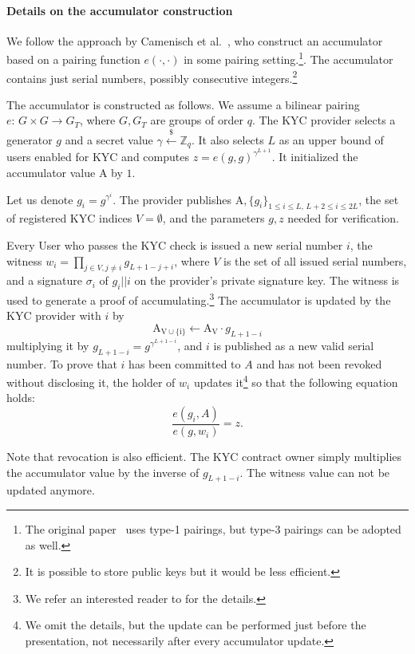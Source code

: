 \paragraph{Details on the accumulator construction}
We follow the approach by Camenisch et al.~\cite{Camenisch2009}, who construct an accumulator based on a pairing function $e(\cdot,\cdot)$ in some pairing setting.\footnote{The original paper~\cite{Camenisch2009} uses type-1 pairings, but type-3 pairings can be adopted as well.}.
The accumulator contains just serial numbers, possibly consecutive integers.\footnote{It is possible to store public keys but it would be less efficient.}

The accumulator is constructed as follows.
We assume a bilinear pairing $e:\,G\times G\rightarrow G_T$, where $G,G_T$ are groups of order $q$.
The KYC provider selects a generator $g$ and a secret value $\gamma\overset{\$}{\leftarrow} \mathbb{Z}_q$.
It also selects $L$ as an upper bound of users enabled for KYC and computes $z = e(g,g)^{\gamma^{L+1}}$.
It initialized the accumulator value $\mathrm{A}$ by $1$. 

Let us denote $g_i = g^{\gamma^i}$.
The provider publishes $\mathrm{A},\{g_i\}_{1\leq i\leq L, \,L+2\leq i \leq 2L}$, the set of registered KYC indices $V=\emptyset$, and the parameters $g,z$ needed for verification.

Every User who passes the KYC check is issued a new serial number $i$, the witness $w_i = \prod_{j\in V,j\neq i} g_{L+1-j+i}$, where $V$ is the set of all issued serial numbers, and a signature $\sigma_i$ of $g_i||i$ on the provider's private signature key.
The witness is used to generate a proof of accumulating.\footnote{We refer an interested reader to \cite{Camenisch2009} for the details.}
The accumulator is updated by the KYC provider with $i$ by
$$
\mathrm{A_{V\cup\{i\}}} \leftarrow \mathrm{A_V} \cdot g_{L+1-i}
$$
multiplying it by $g_{L+1-i} = g^{\gamma^{L+1-i}}$, and $i$ is published as a new valid serial number.
To prove that $i$ has been committed to $A$ and has not been revoked without disclosing it, the holder of $w_i$ updates it\footnote{We omit the details, but the update can be performed just before the presentation, not necessarily after every accumulator update.} so that the following equation holds:
$$
\frac{e(g_i, A)}{e(g,w_i)} = z.
$$

Note that revocation is also efficient.
The KYC contract owner simply multiplies the accumulator value by the inverse of $g_{L+1-i}$.
The witness value can not be updated anymore.

